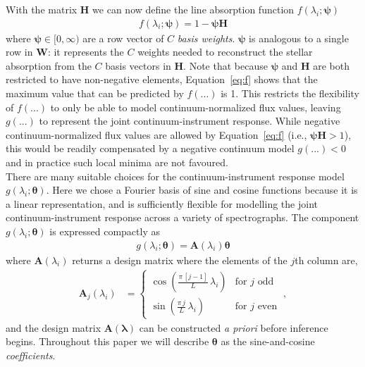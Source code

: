 \documentclass[modern]{aastex631}
\renewcommand{\vec}[1]{\mathbf{#1}}
\newcommand{\vectheta}{\boldsymbol{\theta}}
\newcommand{\vecpsi}{\boldsymbol{\psi}}
\newcommand{\vecW}{\mathbf{W}}
\newcommand{\vecH}{\mathbf{H}}
\begin{document}
\noindent{}With the matrix $\vec{H}$ we can now define the line absorption function $f(\lambda_i;\vecpsi)$ 
\begin{align}
    f(\lambda_i;\vecpsi) = 1 - \vecpsi\vecH \label{eq:f}
\end{align}
where $\vecpsi \in [0, \infty)$ are a row vector of $C$ \emph{basis weights}. $\vecpsi$ is analogous to a single row in $\vecW$: it represents the $C$ weights needed to reconstruct the stellar absorption from the $C$ basis vectors in $\vecH$. Note that because $\vecpsi$ and $\vecH$ are both restricted to have non-negative elements, Equation~\ref{eq:f} shows that the maximum value that can be predicted by $f(...)$ is 1. This restricts the flexibility of $f(...)$ to only be able to model continuum-normalized flux values, leaving $g(...)$ to represent the joint continuum-instrument response. While negative continuum-normalized flux values are allowed by Equation~\ref{eq:f} (i.e., $\vecpsi\vecH > 1$), this would be readily compensated by a negative continuum model $g(...) < 0$ and in practice such local minima are not favoured.\\

There are many suitable choices for the continuum-instrument response model $g(\lambda_i;\vectheta)$. Here we chose a Fourier basis of sine and cosine functions because it is a linear representation, and is sufficiently flexible for modelling the joint continuum-instrument response across a variety of spectrographs. The component $g(\lambda_i;\vectheta)$ is expressed compactly as
\begin{align}
    g(\lambda_i;\vectheta) = \vec{A}(\lambda_i)\vectheta
\end{align}
where $\vec{A}(\lambda_i)$ returns a design matrix where the elements of the $j$th column are, %
\begin{align}
    \vec{A}_{j}(\lambda_i) & = \left\{\begin{array}{cl}\displaystyle\cos\left(\frac{\pi\,[j-1]}{L}\,\lambda_i\right) & \mbox{for $j$ odd} \\[3ex]
                                       \displaystyle\sin\left(\frac{\pi\,j}{L}\,\lambda_i\right) & \mbox{for $j$ even}\end{array}\right. ~,
\end{align}
\noindent{}and the design matrix $\vec{A}(\vec{\lambda})$ can be constructed \emph{a priori} before inference begins. Throughout this paper we will describe $\vectheta$ as the sine-and-cosine \emph{coefficients}.\\ %
\end{document}
